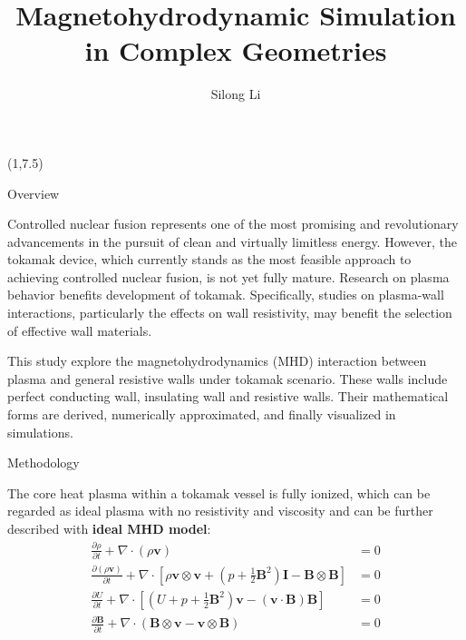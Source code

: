 \documentclass[final]{beamer}
\title{Magnetohydrodynamic Simulation in Complex Geometries}
\author{Silong Li}
\begin{document}
\begin{frame}{} 

\begin{textblock}{19.0}(1,7.5)
	
	
\begin{block}{Overview}
	\centering
	\begin{minipage}{0.93\linewidth}
		\justifying
		Controlled nuclear fusion represents one of the most promising and revolutionary advancements in the pursuit of clean and virtually limitless energy. However, the tokamak device, which currently stands as the most feasible approach to achieving controlled nuclear fusion, is not yet fully mature. Research on plasma behavior benefits development of tokamak. Specifically, studies on plasma-wall interactions, particularly the effects on wall resistivity, may benefit the selection of effective wall materials. 
		
		This study explore the magnetohydrodynamics (MHD) interaction between plasma and general resistive walls under tokamak scenario. These walls include perfect conducting wall, insulating wall and resistive walls. Their mathematical forms are derived, numerically approximated, and finally visualized in simulations.
		
	\end{minipage}
\end{block}
\vspace{-0.5cm}

\begin{block}{Methodology}
	\centering
	\begin{minipage}{0.90\linewidth}
		The core heat plasma within a tokamak vessel is fully ionized, which can be regarded as ideal plasma with no resistivity and viscosity and can be further described with \textbf{ideal MHD model}:
		\vspace{0.1cm}
		\begin{align*}
			\frac{\partial \rho}{\partial t} + \nabla \cdot (\rho \mathbf{v}) &= 0\\
			\frac{\partial (\rho \mathbf{v})}{\partial t} + \nabla \cdot \left[ \rho \mathbf{v} \otimes \mathbf{v} + \left( p + \frac{1}{2}\mathbf{B}^2 \right) \mathbf{I} - \mathbf{B} \otimes \mathbf{B} \right] &= 0 \\
			\frac{\partial U}{\partial t} + \nabla \cdot \left[ \left( U + p + \frac{1}{2}\mathbf{B}^2 \right) \mathbf{v} - (\mathbf{v} \cdot \mathbf{B}) \mathbf{B} \right] &= 0 \\
			\frac{\partial \mathbf{B}}{\partial t} + \nabla \cdot (\mathbf{B} \otimes \mathbf{v} - \mathbf{v} \otimes \mathbf{B}) &= 0
		\end{align*}
		\vspace{-0.3cm}
		

\end{minipage}
\end{block}
\end{textblock}
\end{frame}
\end{document}
